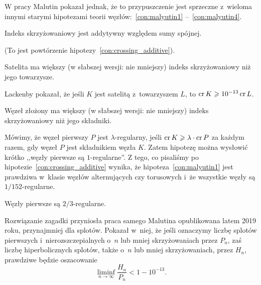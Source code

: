 W pracy \cite{malyutin16} Malutin pokazał jednak, że to przypuszczenie jest sprzeczne z~wieloma innymi starymi hipotezami teorii węzłów:~\ref{con:malyutin1} --~\ref{con:malyutin4}.
%

\begin{conjecture}
\label{con:malyutin1}%
    Indeks skrzyżowaniowy jest addytywny względem sumy spójnej.
%
%
\end{conjecture}

(To jest powtórzenie hipotezy~\ref{con:crossing_additive}).

\begin{conjecture}
    Satelita ma większy (w słabszej wersji: nie mniejszy) indeks skrzyżowaniowy niż jego towarzysze.
\end{conjecture}

Lackenby \cite{lackenby14} pokazał, że jeśli $K$ jest satelitą z~towarzyszem $L$, to $\operatorname{cr} K \geqslant 10^{-13} \operatorname{cr} L$.
%

\begin{conjecture}
    Węzeł złożony ma większy (w słabszej wersji: nie mniejszy) indeks skrzyżowaniowy niż jego składniki.
\end{conjecture}

Mówimy, że węzeł pierwszy $P$ jest $\lambda$-regularny, jeśli $\operatorname{cr} K \geqslant \lambda \cdot \operatorname{cr} P$ za każdym razem, gdy węzeł $P$ jest składnikiem węzła $K$.
Zatem hipotezę można wysłowić krótko ,,węzły pierwsze są $1$-regularne''.
Z tego, co pisaliśmy po hipotezie~\ref{con:crossing_additive} wynika, że hipoteza~\ref{con:malyutin1} jest prawdziwa w~klasie węzłów alternujących czy torusowych i~że wszystkie węzły są $1/152$-regularne.

\begin{conjecture}
    \label{con:malyutin4}
    Węzły pierwsze są $2/3$-regularne.
\end{conjecture}

Rozwiązanie zagadki przyniosła praca samego Malutina \cite{malyutin19} opublikowana latem 2019 roku, przynajmniej dla splotów.
%
Pokazał w~niej, że jeśli oznaczymy liczbę splotów pierwszych i~nierozszczepialnych o~$n$ lub mniej skrzyżowaniach przez $P_n$, zaś liczbę hiperbolicznych splotów, także o~$n$ lub mniej skrzyżowaniach, przez $H_n$, prawdziwe będzie oszacowanie
\begin{equation}
    \liminf_{n \to \infty} \frac{H_n}{P_n} < 1 - 10^{-13}.
\end{equation}

